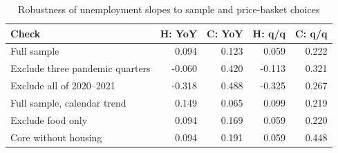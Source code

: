 \begin{table}[H]
\centering\small
\caption{Robustness of unemployment slopes to sample and price-basket choices}
\label{tab:robustness}
\begin{tabularx}{\linewidth}{Xrrrr}
\toprule
Check & H: YoY & C: YoY & H: q/q & C: q/q\\
\midrule
Full sample & 0.094 & 0.123 & 0.059 & 0.222\\
Exclude three pandemic quarters & -0.060 & 0.420 & -0.113 & 0.321\\
Exclude all of 2020--2021 & -0.318 & 0.488 & -0.325 & 0.267\\
Full sample, calendar trend & 0.149 & 0.065 & 0.099 & 0.219\\
Exclude food only & 0.094 & 0.169 & 0.059 & 0.220\\
Core without housing & 0.094 & 0.191 & 0.059 & 0.448\\
\bottomrule
\end{tabularx}
\end{table}
